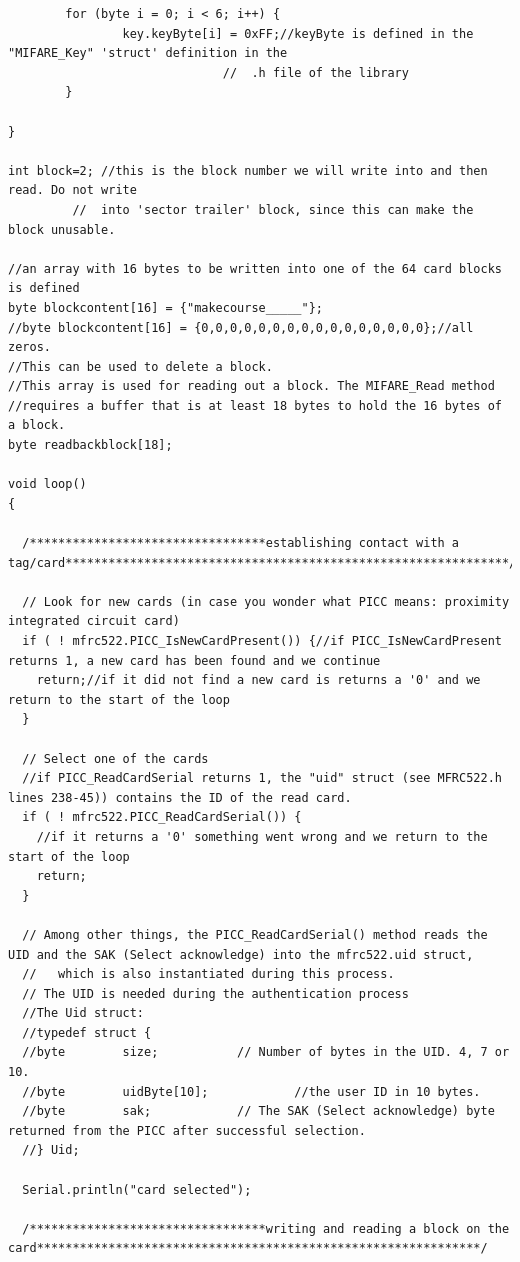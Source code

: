 \documentclass[a4paper, 11pt]{article}           %
\begin{document}
\begin{lstlisting}
        for (byte i = 0; i < 6; i++) {
                key.keyByte[i] = 0xFF;//keyByte is defined in the "MIFARE_Key" 'struct' definition in the
		                      //  .h file of the library
        }

}

int block=2; //this is the block number we will write into and then read. Do not write
	     //  into 'sector trailer' block, since this can make the block unusable.

//an array with 16 bytes to be written into one of the 64 card blocks is defined
byte blockcontent[16] = {"makecourse_____"};
//byte blockcontent[16] = {0,0,0,0,0,0,0,0,0,0,0,0,0,0,0,0};//all zeros.
//This can be used to delete a block.
//This array is used for reading out a block. The MIFARE_Read method
//requires a buffer that is at least 18 bytes to hold the 16 bytes of a block.
byte readbackblock[18];

void loop()
{

  /*********************************establishing contact with a tag/card**************************************************************/

  // Look for new cards (in case you wonder what PICC means: proximity integrated circuit card)
  if ( ! mfrc522.PICC_IsNewCardPresent()) {//if PICC_IsNewCardPresent returns 1, a new card has been found and we continue
    return;//if it did not find a new card is returns a '0' and we return to the start of the loop
  }

  // Select one of the cards
  //if PICC_ReadCardSerial returns 1, the "uid" struct (see MFRC522.h lines 238-45)) contains the ID of the read card.
  if ( ! mfrc522.PICC_ReadCardSerial()) {
    //if it returns a '0' something went wrong and we return to the start of the loop
    return;
  }

  // Among other things, the PICC_ReadCardSerial() method reads the UID and the SAK (Select acknowledge) into the mfrc522.uid struct,
  //   which is also instantiated during this process.
  // The UID is needed during the authentication process
  //The Uid struct:
  //typedef struct {
  //byte		size;			// Number of bytes in the UID. 4, 7 or 10.
  //byte		uidByte[10];            //the user ID in 10 bytes.
  //byte		sak;			// The SAK (Select acknowledge) byte returned from the PICC after successful selection.
  //} Uid;

  Serial.println("card selected");

  /*********************************writing and reading a block on the card**************************************************************/


\end{lstlisting}
\end{document}
